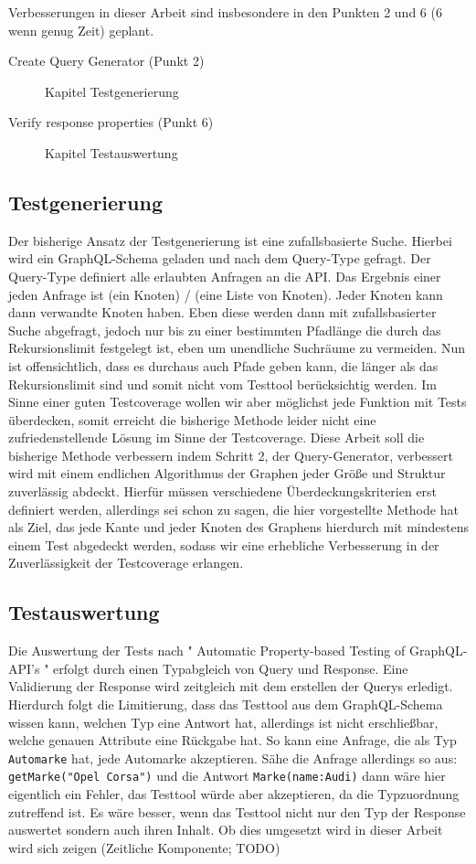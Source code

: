 Verbesserungen in dieser Arbeit sind insbesondere in den Punkten 2 und 6 (6 wenn genug Zeit) geplant.

\begin{description}
    \item[Create Query Generator (Punkt 2)] Kapitel Testgenerierung
    \item[Verify response properties (Punkt 6)] Kapitel Testauswertung
\end{description}

\subsection{Testgenerierung}

Der bisherige Ansatz der Testgenerierung ist eine zufallsbasierte Suche.
Hierbei wird ein GraphQL-Schema geladen und nach dem Query-Type gefragt.
Der Query-Type definiert alle erlaubten Anfragen an die API.
Das Ergebnis einer jeden Anfrage ist (ein Knoten) / (eine Liste von Knoten).
Jeder Knoten kann dann verwandte Knoten haben.
Eben diese werden dann mit zufallsbasierter Suche abgefragt, jedoch nur bis zu einer bestimmten Pfadlänge die
durch das Rekursionslimit festgelegt ist, eben um unendliche Suchräume zu vermeiden.
Nun ist offensichtlich, dass es durchaus auch Pfade geben kann, die länger
als das Rekursionslimit sind und somit nicht vom Testtool berücksichtig werden.
Im Sinne einer guten Testcoverage wollen wir aber möglichst
jede Funktion mit Tests überdecken, somit erreicht die bisherige Methode leider nicht eine zufriedenstellende Lösung im Sinne
der Testcoverage.
Diese Arbeit soll die bisherige Methode verbessern indem Schritt 2, der Query-Generator, verbessert wird mit einem
endlichen Algorithmus der Graphen jeder Größe und Struktur zuverlässig abdeckt. Hierfür müssen verschiedene Überdeckungskriterien
erst definiert werden, allerdings sei schon zu sagen, die hier vorgestellte Methode hat als Ziel, das jede Kante und jeder
Knoten des Graphens hierdurch mit mindestens einem Test abgedeckt werden, sodass wir eine erhebliche Verbesserung in der
Zuverlässigkeit der Testcoverage erlangen.

\subsection{Testauswertung}


Die Auswertung der Tests nach " Automatic Property-based Testing of GraphQL-API's " erfolgt durch einen Typabgleich von Query und Response.
Eine Validierung der Response wird zeitgleich mit dem erstellen der Querys erledigt. Hierdurch folgt die Limitierung, dass das Testtool
aus dem GraphQL-Schema wissen kann, welchen Typ eine Antwort hat, allerdings ist nicht erschließbar, welche genauen Attribute eine Rückgabe hat.
So kann eine Anfrage, die als Typ \verb+Automarke+ hat, jede Automarke akzeptieren.
Sähe die Anfrage allerdings so aus: \verb+getMarke("Opel Corsa")+ und die Antwort \verb+Marke(name:Audi)+ dann wäre hier eigentlich
ein Fehler, das Testtool würde aber akzeptieren, da die Typzuordnung zutreffend ist.
Es wäre besser, wenn das Testtool nicht nur den Typ der Response auswertet sondern auch ihren Inhalt.
Ob dies umgesetzt wird in dieser Arbeit wird sich zeigen (Zeitliche Komponente; TODO)
\newpage

